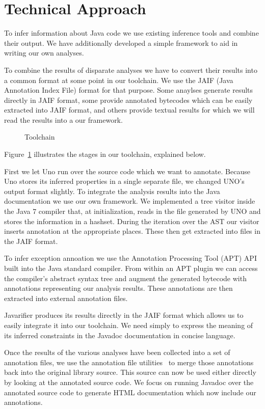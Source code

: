 \section{Technical Approach}
To infer information about Java code we use existing inference tools and
combine their output. We have additionally developed a simple framework to aid
in writing our own analyses.

To combine the results of disparate analyses we have to convert their results
into a common format at some point in our toolchain.  We use the JAIF
(Java Annotation Index File) format for that purpose.  Some anaylses generate
results directly in JAIF format, some provide annotated bytecodes which can be
easily extracted into JAIF format, and others provide textual results for which
we will read the results into a our framework.

\begin{figure}
\centering
{}
\caption{Toolchain}
\label{fig:toolchain}
\end{figure}

Figure~\ref{fig:toolchain} 
illustrates the stages in our toolchain, explained below.

First we let Uno run over the source code which we want to annotate. 
Because Uno stores its inferred properties in a single separate file, 
we changed UNO's output format slightly. 
To integrate the analysis results into the Java documentation we
use our own framework. We implemented a tree visitor inside the Java 7 
compiler that, at initialization, reads in the file generated by UNO and 
stores the information in a hashset. During the iteration over the AST
our visitor inserts annotation at the appropriate places. These then
get extracted into files in the JAIF format.

To infer exception annoation we use the Annotation Processing Tool (APT)
API~\cite{apt} built into the Java standard compiler.
From within an APT plugin
we can access the compiler's abstract syntax tree and augment the generated
bytecode with annotations representing our analysis results. These annotations
are then extracted into external annotation files.

Javarifier produces its results directly in the JAIF format which allows us to
easily integrate it into our toolchain. We need simply to express the meaning
of its inferred constraints in the Javadoc documentation in concise language.

Once the results of the various analyses have been collected into a set of
annotation files, we use the annotation file utilities~\cite{AFU} to merge
those annotations back into the original library source. This source
can now be used either directly by looking at the annotated source code. We
focus on running Javadoc over the annotated source code to generate HTML documentation
which now include our annotations.

